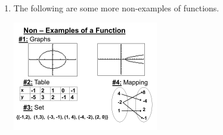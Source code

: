 \begin{exs}
\begin{enumerate}
    \item The following are some more non-examples of functions.
          \begin{center}
            \includegraphics[width=0.5\textwidth]{notfunction}
          \end{center}
  \end{enumerate}
\end{exs}

